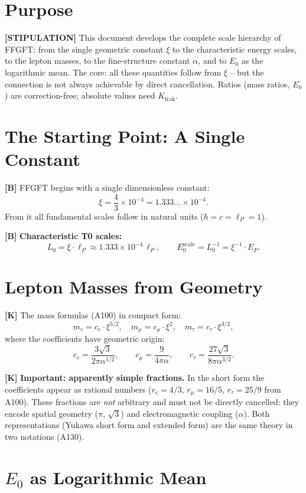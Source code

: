 \section{Purpose}

\textbf{[STIPULATION]} This document develops the complete scale hierarchy of FFGFT:
from the single geometric constant $\xi$ to the characteristic energy scales, to
the lepton masses, to the fine-structure constant $\alpha$, and to $E_0$ as the
logarithmic mean. The core: all these quantities follow from $\xi$ -- but the
connection is not always achievable by direct cancellation. Ratios (mass ratios,
$E_0$) are correction-free; absolute values need $K_\text{frak}$.

\section{The Starting Point: A Single Constant}

\textbf{[B]} FFGFT begins with a single dimensionless constant:
\[
  \xi = \frac{4}{3}\times10^{-4} = 1{.}333\ldots\times10^{-4}.
\]
From it all fundamental scales follow in natural units ($\hbar=c=\ell_P=1$).

\textbf{[B]} \textbf{Characteristic T0 scales:}
\[
  L_0 = \xi\cdot\ell_P \approx 1{.}333\times10^{-4}\,\ell_P,
  \qquad
  E_0^\text{scale} = L_0^{-1} = \xi^{-1}\cdot E_P.
\]

\section{Lepton Masses from Geometry}

\textbf{[K]} The mass formulas (A100) in compact form:
\[
  m_e = c_e\cdot\xi^{5/2},
  \quad
  m_\mu = c_\mu\cdot\xi^2,
  \quad
  m_\tau = c_\tau\cdot\xi^{3/2},
\]
where the coefficients have geometric origin:
\[
  c_e = \frac{3\sqrt3}{2\pi\alpha^{1/2}},
  \qquad
  c_\mu = \frac{9}{4\pi\alpha},
  \qquad
  c_\tau = \frac{27\sqrt3}{8\pi\alpha^{3/2}}.
\]

\textbf{[K]} \textbf{Important: apparently simple fractions.} In the short form
the coefficients appear as rational numbers ($r_e=4/3$, $r_\mu=16/5$,
$r_\tau=25/9$ from A100). These fractions are \emph{not} arbitrary and must not
be directly cancelled: they encode spatial geometry ($\pi$, $\sqrt3$) and
electromagnetic coupling ($\alpha$). Both representations (Yukawa short form and
extended form) are the same theory in two notations (A130).

\section{$E_0$ as Logarithmic Mean}

